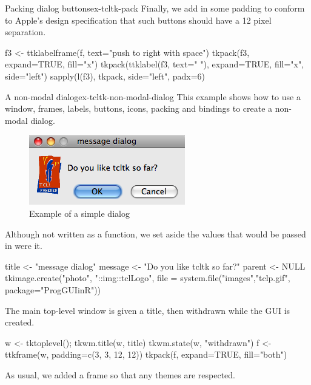 \begin{example}{Packing dialog buttons}{ex-tcltk-pack}
Finally, we add in some padding to conform to Apple's design specification that such
buttons should have a 12 pixel separation.
\begin{Schunk}
\begin{Sinput}
 f3 <- ttklabelframe(f, text="push to right with space")
 tkpack(f3, expand=TRUE, fill="x")
 tkpack(ttklabel(f3, text=" "), expand=TRUE, fill="x", 
        side="left")
 sapply(l(f3), tkpack, side="left", padx=6)
\end{Sinput}
\end{Schunk}
\end{example}

\begin{example}{A non-modal dialog}{ex-tcltk-non-modal-dialog}
This example shows how to use  a window, frames,  labels, buttons,
icons, packing and bindings to create a non-modal dialog. 

\begin{figure}
  \centering
  \includegraphics[width=.4\textwidth]{fig-tcltk-simple-dialog.png}
  \caption{Example of a simple dialog}
  \label{fig:fig-tcltk-simple-dialog}
\end{figure}

Although not written as a function, we set aside the values that would
be passed in were it.
\begin{Schunk}
\begin{Sinput}
 title <- "message dialog"
 message <- "Do you like tcltk so far?"
 parent <- NULL
 tkimage.create("photo", "::img::tclLogo", 
                file = system.file("images","tclp.gif",
                  package="ProgGUIinR"))
\end{Sinput}
\end{Schunk}

The main top-level window is given a title, then withdrawn while
the GUI is created. 
\begin{Schunk}
\begin{Sinput}
 w <- tktoplevel(); tkwm.title(w, title)
 tkwm.state(w, "withdrawn")
 f <- ttkframe(w,  padding=c(3, 3, 12, 12))
 tkpack(f, expand=TRUE, fill="both")
\end{Sinput}
\end{Schunk}
As usual, we added a frame so that any themes are respected.


\end{example}

